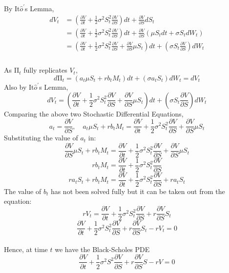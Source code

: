 By It$\hat{o}^{\prime}$s Lemma, 
\begin{equation*}
\begin{split}
dV_{t}
&= (\frac{\partial V}{\partial t}+\frac{1}{2}\sigma^{2}S_{t}^{2}\frac{\partial V}{\partial S})dt + \frac{\partial V}{\partial S}dS_{t}\\
&= (\frac{\partial V}{\partial t}+\frac{1}{2}\sigma^{2}S_{t}^{2}\frac{\partial V}{\partial S})dt + \frac{\partial V}{\partial S}(\mu S_{t}dt + \sigma S_{t}dW_{t})\\
&= (\frac{\partial V}{\partial t}+\frac{1}{2}\sigma^{2}S_{t}^{2}\frac{\partial V}{\partial S}+\frac{\partial V}{\partial S}\mu S_{t})dt + (\sigma S_{t}\frac{\partial V}{\partial S})dW_{t}\\
\end{split}
\end{equation*}
\\
As $\mathrm{\Pi}_{t}$ fully replicates $V_{t}$,
$$d\mathrm{\Pi}_{t} = (a_{t}\mu S_{t} + rb_{t}M_{t})dt + (\sigma a_{t}S_{t})dW_{t} = dV_{t}$$
Also by It$\hat{o}^{\prime}$s Lemma, 
$$dV_{t} = (\frac{\partial V}{\partial t}+\frac{1}{2}\sigma^{2}S_{t}^{2}\frac{\partial V}{\partial S}+\frac{\partial V}{\partial S}\mu S_{t})dt + (\sigma S_{t}\frac{\partial V}{\partial S})dW_{t}$$
Comparing the above two Stochastic Differential Equations,
$$a_{t} = \frac{\partial V}{\partial S}, \quad a_{t}\mu S_{t} + rb_{t}M_{t} = \frac{\partial V}{\partial t}+\frac{1}{2}\sigma^{2}S_{t}^{2}\frac{\partial V}{\partial S}+\frac{\partial V}{\partial S}\mu S_{t}$$
Substituting the value of $a_{t}$ in:
$$\frac{\partial V}{\partial S}\mu S_{t} + rb_{t}M_{t} = \frac{\partial V}{\partial t}+\frac{1}{2}\sigma^{2}S_{t}^{2}\frac{\partial V}{\partial S}+\frac{\partial V}{\partial S}\mu S_{t}$$
$$rb_{t}M_{t} = \frac{\partial V}{\partial t}+\frac{1}{2}\sigma^{2}S_{t}^{2}\frac{\partial V}{\partial S}$$
$$ra_{t}S_{t}+rb_{t}M_{t} = \frac{\partial V}{\partial t}+\frac{1}{2}\sigma^{2}S_{t}^{2}\frac{\partial V}{\partial S}+ra_{t}S_{t}$$
The value of $b_{t}$ has not been solved fully but it can be taken out from the equation:
$$rV_{t} = \frac{\partial V}{\partial t}+\frac{1}{2}\sigma^{2}S_{t}^{2}\frac{\partial V}{\partial S}+r\frac{\partial V}{\partial S}S_{t}$$
$$\frac{\partial V}{\partial t}+\frac{1}{2}\sigma^{2}S_{t}^{2}\frac{\partial V}{\partial S}+r\frac{\partial V}{\partial S}S_{t}- rV_{t} = 0$$\\
Hence, at time $t$ we have the Black-Scholes PDE
$$\frac{\partial V}{\partial t}+\frac{1}{2}\sigma^{2}S^{2}\frac{\partial V}{\partial S}+r\frac{\partial V}{\partial S}S- rV = 0$$

